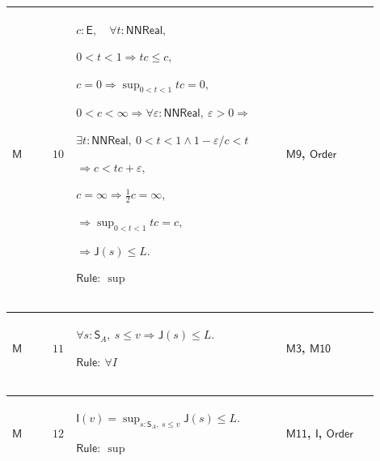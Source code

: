 \documentclass[12pt,reqno]{amsart}
\theoremstyle{blueplain}
\numberwithin{equation}{section}
\begin{document}
{\scriptsize \setlength{\parskip}{0pt}\nointerlineskip
\noindent 
\begin{tabular}{|@{}>{\centering\arraybackslash}m{0.10658\linewidth}|>{\centering\arraybackslash}m{0.03553\linewidth}|>{\centering\arraybackslash}m{0.52105\linewidth}|>{\centering\arraybackslash}m{0.23684\linewidth}|}
\hline
\hypertarget{proof:M10}{$\displaystyle \mathsf{M}$} & $\displaystyle 10$ & $%
\displaystyle c:\mathsf{E},\quad\forall t:\mathsf{NNReal},$\par$%
\displaystyle 0<t<1\Rightarrow tc\le c,$\par$\displaystyle %
c=0\Rightarrow\sup_{0<t<1}tc=0,$\par$\displaystyle 0<c<\infty\Rightarrow%
\forall\varepsilon:\mathsf{NNReal},\ \varepsilon>0\Rightarrow$\par$%
\displaystyle \exists t:\mathsf{NNReal},\ 0<t<1\land1-\varepsilon/c<t$\par$%
\displaystyle \Rightarrow c<tc+\varepsilon,$\par$\displaystyle %
c=\infty\Rightarrow\tfrac12c=\infty,$\par$\displaystyle \Rightarrow%
\sup_{0<t<1}tc=c,$\par$\displaystyle \Rightarrow\mathsf{J}(s)\le L.$\par$%
\displaystyle \mathsf{Rule}:\ \sup$ & \hyperlink{proof:M9}{$\displaystyle 
\mathsf{M9}$}, \hyperlink{ax:Order}{$\displaystyle \mathsf{Order}$} \\ \hline
\end{tabular}%
}

{\scriptsize \setlength{\parskip}{0pt}\nointerlineskip
\noindent 
\begin{tabular}{|@{}>{\centering\arraybackslash}m{0.10658\linewidth}|>{\centering\arraybackslash}m{0.03553\linewidth}|>{\centering\arraybackslash}m{0.52105\linewidth}|>{\centering\arraybackslash}m{0.23684\linewidth}|}
\hline
\hypertarget{proof:M11}{$\displaystyle \mathsf{M}$} & $\displaystyle 11$ & $%
\displaystyle \forall s:\mathsf{S}_A,\ s\le v\Rightarrow\mathsf{J}(s)\le L.$%
\par$\displaystyle \mathsf{Rule}:\ \forall I$ & \hyperlink{proof:M3}{$%
\displaystyle \mathsf{M3}$}, \hyperlink{proof:M10}{$\displaystyle \mathsf{M10%
}$} \\ \hline
\end{tabular}%
}

{\scriptsize \setlength{\parskip}{0pt}\nointerlineskip
\noindent 
\begin{tabular}{|@{}>{\centering\arraybackslash}m{0.10658\linewidth}|>{\centering\arraybackslash}m{0.03553\linewidth}|>{\centering\arraybackslash}m{0.52105\linewidth}|>{\centering\arraybackslash}m{0.23684\linewidth}|}
\hline
\hypertarget{proof:M12}{$\displaystyle \mathsf{M}$} & $\displaystyle 12$ & $%
\displaystyle \mathsf{I}(v)=\sup_{s:\mathsf{S}_A,\ s\le v}\mathsf{J}(s)\le
L. $\par$\displaystyle \mathsf{Rule}:\ \sup$ & \hyperlink{proof:M11}{$%
\displaystyle \mathsf{M11}$}, \hyperlink{def:I}{$\displaystyle \mathsf{I}$}, 
\hyperlink{ax:Order}{$\displaystyle \mathsf{Order}$} \\ \hline
\end{tabular}%
}
\end{document}
